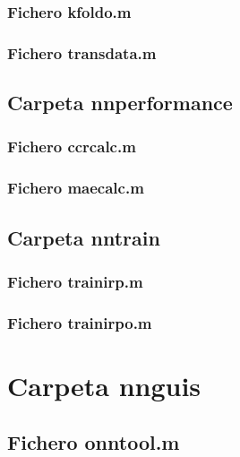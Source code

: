 			\subsubsection{Fichero kfoldo.m}
			
			
			
			\subsubsection{Fichero transdata.m}
			
			
			
		\subsection{Carpeta nnperformance}
		
			\subsubsection{Fichero ccrcalc.m}
			
			
			
			\subsubsection{Fichero maecalc.m}
			
			
			
		\subsection{Carpeta nntrain}
		
			\subsubsection{Fichero trainirp.m}
			
			
			
			\subsubsection{Fichero trainirpo.m}
			
			
		
	\section{Carpeta nnguis}
	
		\subsection{Fichero onntool.m}
			
			
